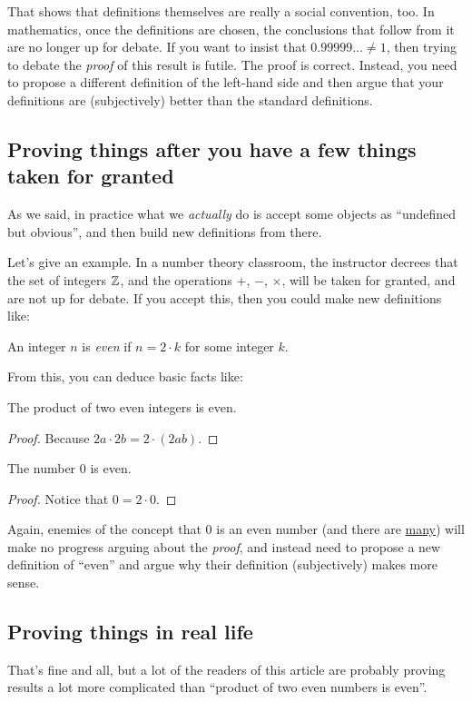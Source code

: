 \documentclass[11pt]{scrartcl}
\begin{document}
That shows that definitions themselves are really a social convention, too.
In mathematics, once the definitions are chosen,
the conclusions that follow from it are no longer up for debate.
If you want to insist that $0.99999\dots \neq 1$,
then trying to debate the \emph{proof} of this result is futile.
The proof is correct.
Instead, you need to propose a different definition of the left-hand side
and then argue that your definitions are (subjectively)
better than the standard definitions.

\subsection{Proving things after you have a few things taken for granted}
As we said, in practice what we \emph{actually} do is
accept some objects as ``undefined but obvious'',
and then build new definitions from there.

Let's give an example.
In a number theory classroom, the instructor decrees that the
set of integers $\mathbb Z$, and the operations $+$, $-$, $\times$,
will be taken for granted, and are not up for debate.
If you accept this, then you could make new definitions like:
\begin{definition}
  An integer $n$ is \emph{even} if $n = 2 \cdot k$ for some integer $k$.
\end{definition}
From this, you can deduce basic facts like:
\begin{fact}
The product of two even integers is even.
\end{fact}
\begin{proof}
Because $2a \cdot 2b = 2 \cdot (2ab)$.
\end{proof}
\begin{fact}
  The number $0$ is even.
\end{fact}
\begin{proof}
  Notice that $0 = 2 \cdot 0$.
\end{proof}
Again, enemies of the concept that $0$ is an even number
(and there are \href{https://en.wikipedia.org/wiki/Parity_of_zero}{many})
will make no progress arguing about the \emph{proof},
and instead need to propose a new definition of ``even''
and argue why their definition (subjectively) makes more sense.

\subsection{Proving things in real life}
That's fine and all, but a lot of the readers of this article
are probably proving results a lot more complicated than
``product of two even numbers is even''.
\end{document}
